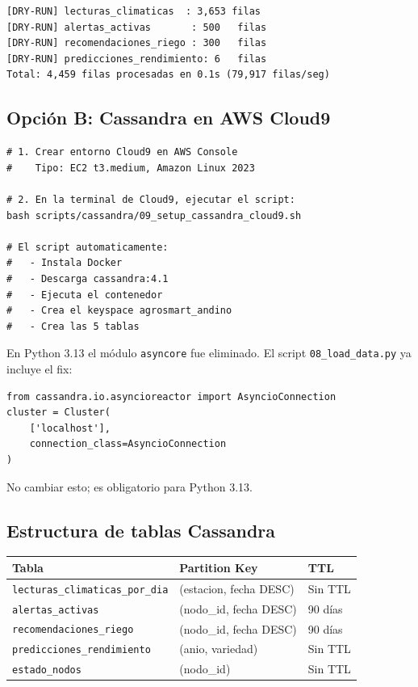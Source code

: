 \documentclass[11pt,a4paper]{article}
\begin{document}
\begin{okbox}[]
\begin{lstlisting}
[DRY-RUN] lecturas_climaticas  : 3,653 filas
[DRY-RUN] alertas_activas       : 500   filas
[DRY-RUN] recomendaciones_riego : 300   filas
[DRY-RUN] predicciones_rendimiento: 6   filas
Total: 4,459 filas procesadas en 0.1s (79,917 filas/seg)
\end{lstlisting}
\end{okbox}

\subsection{Opci\'on B: Cassandra en AWS Cloud9}

\begin{awsbox}
\begin{lstlisting}[style=bash]
# 1. Crear entorno Cloud9 en AWS Console
#    Tipo: EC2 t3.medium, Amazon Linux 2023

# 2. En la terminal de Cloud9, ejecutar el script:
bash scripts/cassandra/09_setup_cassandra_cloud9.sh

# El script automaticamente:
#   - Instala Docker
#   - Descarga cassandra:4.1
#   - Ejecuta el contenedor
#   - Crea el keyspace agrosmart_andino
#   - Crea las 5 tablas
\end{lstlisting}
\end{awsbox}

\begin{alertbox}
En Python 3.13 el m\'odulo \texttt{asyncore} fue eliminado. El script
\texttt{08\_load\_data.py} ya incluye el fix:
\begin{lstlisting}[style=python]
from cassandra.io.asyncioreactor import AsyncioConnection
cluster = Cluster(
    ['localhost'],
    connection_class=AsyncioConnection
)
\end{lstlisting}
No cambiar esto; es obligatorio para Python 3.13.
\end{alertbox}

\subsection{Estructura de tablas Cassandra}

\begin{tabular}{lll}
\toprule
Tabla & Partition Key & TTL \\
\midrule
\texttt{lecturas\_climaticas\_por\_dia} & (estacion, fecha DESC) & Sin TTL \\
\texttt{alertas\_activas} & (nodo\_id, fecha DESC) & 90 d\'ias \\
\texttt{recomendaciones\_riego} & (nodo\_id, fecha DESC) & 90 d\'ias \\
\texttt{predicciones\_rendimiento} & (anio, variedad) & Sin TTL \\
\texttt{estado\_nodos} & (nodo\_id) & Sin TTL \\
\bottomrule
\end{tabular}
\end{document}
